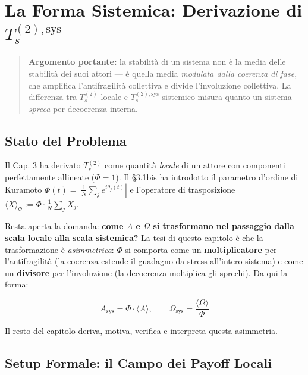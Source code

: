 \chapter{\texorpdfstring{La Forma Sistemica: Derivazione di
\(T_s^{(2),\text{sys}}\)}{La Forma Sistemica: Derivazione di T\_s\^{}\{(2),\textbackslash text\{sys\}\}}}\label{la-forma-sistemica-derivazione-di-t_s2textsys}

\begin{quote}
\textbf{Argomento portante:} la stabilità di un sistema non è la media
delle stabilità dei suoi attori --- è quella media \emph{modulata dalla
coerenza di fase}, che amplifica l'antifragilità collettiva e divide
l'involuzione collettiva. La differenza tra \(T_s^{(2)}\) locale e
\(T_s^{(2),\text{sys}}\) sistemico misura quanto un sistema
\emph{spreca} per decoerenza interna.
\end{quote}



\section{Stato del Problema}\label{stato-del-problema}

Il Cap. 3 ha derivato \(T_s^{(2)}\) come quantità \emph{locale} di un
attore con componenti perfettamente allineate (\(\Phi = 1\)). Il \S{}3.1bis
ha introdotto il parametro d'ordine di Kuramoto
\(\Phi(t) = \left|\frac{1}{N}\sum_j e^{i\theta_j(t)}\right|\) e
l'operatore di trasposizione
\(\langle X \rangle_\Phi := \Phi \cdot \frac{1}{N}\sum_j X_j\).

Resta aperta la domanda: \textbf{come \(A\) e \(\Omega\) si trasformano
nel passaggio dalla scala locale alla scala sistemica?} La tesi di
questo capitolo è che la trasformazione è \emph{asimmetrica}: \(\Phi\)
si comporta come un \textbf{moltiplicatore} per l'antifragilità (la
coerenza estende il guadagno da stress all'intero sistema) e come un
\textbf{divisore} per l'involuzione (la decoerenza moltiplica gli
sprechi). Da qui la forma:

\[
A_{\text{sys}} = \Phi \cdot \langle A \rangle, \qquad \Omega_{\text{sys}} = \frac{\langle \Omega \rangle}{\Phi}
\]

Il resto del capitolo deriva, motiva, verifica e interpreta questa
asimmetria.



\section{Setup Formale: il Campo dei Payoff
Locali}\label{setup-formale-il-campo-dei-payoff-locali}

